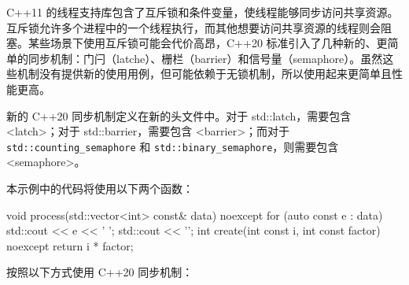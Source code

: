 C++11 的线程支持库包含了互斥锁和条件变量，使线程能够同步访问共享资源。互斥锁允许多个进程中的一个线程执行，而其他想要访问共享资源的线程则会阻塞。某些场景下使用互斥锁可能会代价高昂，C++20 标准引入了几种新的、更简单的同步机制：门闩（latche）、栅栏（barrier）和信号量（semaphore）。虽然这些机制没有提供新的使用用例，但可能依赖于无锁机制，所以使用起来更简单且性能更高。


新的 C++20 同步机制定义在新的头文件中。对于 std::latch，需要包含 <latch>；对于 std::barrier，需要包含 <barrier>；而对于 \verb|std::counting_semaphore| 和 \verb|std::binary_semaphore|，则需要包含 <semaphore>。

本示例中的代码将使用以下两个函数：

\begin{cpp}
void process(std::vector<int> const& data) noexcept
{
    for (auto const e : data)
        std::cout << e << ' ';
    std::cout << '\n';
}
int create(int const i, int const factor) noexcept
{
    return i * factor;
}
\end{cpp}


按照以下方式使用 C++20 同步机制：

